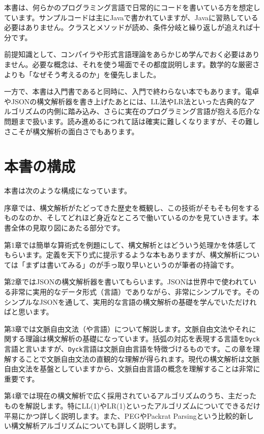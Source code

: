 本書は、何らかのプログラミング言語で日常的にコードを書いている方を想定しています。サンプルコードは主にJavaで書かれていますが、Javaに習熟している必要はありません。クラスとメソッドが読め、条件分岐と繰り返しが追えれば十分です。

前提知識として、コンパイラや形式言語理論をあらかじめ学んでおく必要はありません。必要な概念は、それを使う場面でその都度説明します。数学的な厳密さよりも「なぜそう考えるのか」を優先しました。

一方で、本書は入門書であると同時に、入門で終わらない本でもあります。電卓やJSONの構文解析器を書き上げたあとには、LL法やLR法といった古典的なアルゴリズムの内側に踏み込み、さらに実在のプログラミング言語が抱える厄介な問題まで扱います。読み進めるにつれて話は確実に難しくなりますが、その難しさこそが構文解析の面白さでもあります。

\section*{本書の構成}

本書は次のような構成になっています。

序章では、構文解析がたどってきた歴史を概観し、この技術がそもそも何をするものなのか、そしてどれほど身近なところで働いているのかを見ていきます。本書全体の見取り図にあたる部分です。

第1章では簡単な算術式を例題にして、構文解析とはどういう処理かを体感してもらいます。定義を天下り式に提示するような本もありますが、構文解析については「まずは書いてみる」のが手っ取り早いというのが筆者の持論です。

第2章ではJSONの構文解析器を書いてもらいます。JSONは世界中で使われている非常に実用的なデータ形式（言語）でありながら、非常にシンプルです。そのシンプルなJSONを通して、実用的な言語の構文解析の基礎を学んでいただければと思います。

第3章では文脈自由文法（や言語）について解説します。文脈自由文法やそれに関する理論は構文解析の基礎になっています。括弧の対応を表現する言語を\texttt{Dyck}言語と言いますが、\texttt{Dyck}言語は文脈自由言語を特徴づけるものです。この章を理解することで文脈自由文法の直観的な理解が得られます。現代の構文解析は文脈自由文法を基盤としていますから、文脈自由言語の概念を理解することは非常に重要です。

第4章では現在の構文解析で広く採用されているアルゴリズムのうち、主だったものを解説します。特にLL(1)やLR(1)といったアルゴリズムについてできるだけ平易にかつ詳しく説明します。また、PEGやPackrat
Parsingという比較的新しい構文解析アルゴリズムについても詳しく説明します。

